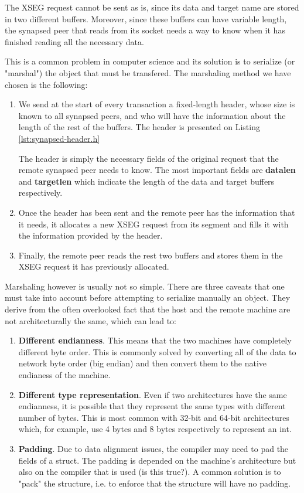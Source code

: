 The XSEG request cannot be sent as is, since its data and target name are 
stored in two different buffers. Moreover, since these buffers can have 
variable length, the synapsed peer that reads from its socket needs a way to 
know when it has finished reading all the necessary data.

This is a common problem in computer science and its solution is to serialize 
(or "marshal") the object that must be transfered. The marshaling method we 
have chosen is the following:

\begin{enumerate}
	\item We send at the start of every transaction a fixed-length header, 
		whose size is known to all synapsed peers, and who will have the 
		information about the length of the rest of the buffers. The header is 
		presented on Listing \ref{lst:synapsed-header.h}


		The header is simply the necessary fields of the original request that 
		the remote synapsed peer needs to know. The most important fields are 
		\textbf{datalen} and \textbf{targetlen} which indicate the length of 
		the data and target buffers respectively.
	\item Once the header has been sent and the remote peer has the information 
		that it needs, it allocates a new XSEG request from its segment and 
		fills it with the information provided by the header.
	\item Finally, the remote peer reads the rest two buffers and stores them 
		in the XSEG request it has previously allocated.
\end{enumerate}

Marshaling however is usually not so simple. There are three caveats that one 
must take into account before attempting to serialize manually an object. They 
derive from the often overlooked fact that the host and the remote machine are 
not architecturally the same, which can lead to:

\begin{enumerate}
	\item \textbf{Different endianness}. This means that the two machines have 
		completely different byte order. This is commonly solved by converting 
		all of the data to network byte order (big endian) and then convert 
		them to the native endianess of the machine.
	\item \textbf{Different type representation}. Even if two architectures 
		have the same endianness, it is possible that they represent the same 
		types with different number of bytes. This is most common with 32-bit 
		and 64-bit architectures which, for example, use 4 bytes and 8 bytes 
		respectively to represent an int.
	\item \textbf{Padding}. Due to data alignment issues, the compiler may need 
		to pad the fields of a struct. The padding is depended on the machine's 
		architecture but also on the compiler that is used (\fixme is this 
		true?).  A common solution is to "pack" the structure, i.e. to enforce 
		that the structure will have no padding.
\end{enumerate}

